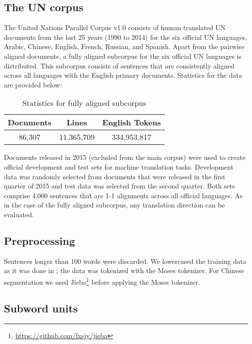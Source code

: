 \documentclass[11pt]{article}
\begin{document}
\subsection{The UN corpus}

The United Nations Parallel Corpus v1.0 \cite{ZIEMSKI16.1195} consists of human translated UN documents from the last 25 years (1990 to 2014) for the six official UN languages, Arabic, Chinese, English, French, Russian, and Spanish. Apart from the pairwise aligned documents, a fully aligned subcorpus for the six official UN languages is distributed. This subcorpus consists of sentences that are consistently aligned across all languages with the English primary documents. Statistics for the data are provided below:

\begin{table}[h]
\centering \setlength{\arrayrulewidth}{1pt}
\begin{tabular}{|c|c|c|}
\hline
Documents & Lines & English Tokens \\ \hline
86,307 & 11,365,709 & 334,953,817 \\ \hline
\end{tabular} 
\caption{Statistics for fully aligned subcorpus}
\label{tab.statistics.fully}
\end{table}

Documents released in 2015 (excluded from the main corpus) were used to create official development and test sets for machine translation tasks. Development data was randomly selected from documents that were released in the first quarter of 2015 and test data was selected from the second quarter. 
Both sets comprise 4,000 sentences that are 1-1 alignments across all official languages. As in the case of the fully aligned subcorpus, any translation direction can be evaluated.

\subsection{Preprocessing}

Sentences longer than 100 words were discarded. We lowercased the training data as it was done in ; the data was tokenized with the Moses tokenizer. For Chinese segmentation we used Jieba\footnote{\url{https://github.com/fxsjy/jieba}} before applying the Moses tokenizer. 

\subsection{Subword units}
\end{document}
